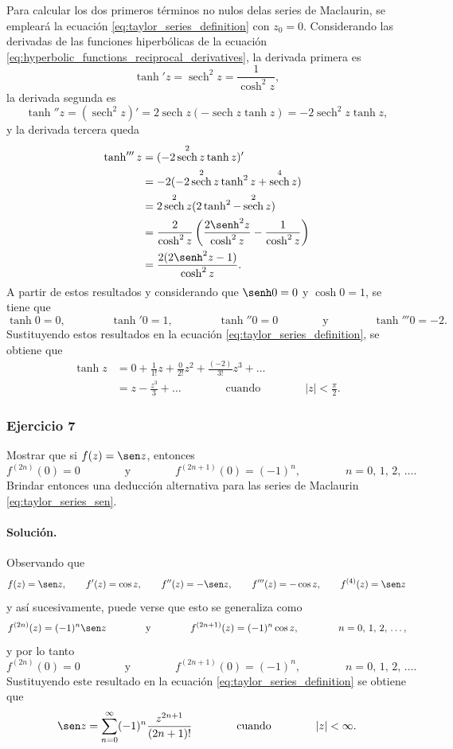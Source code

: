 \documentclass[a4paper]{report}
\DeclareMathOperator{\sech}{sech}
\begin{document}
Para calcular los dos primeros términos no nulos delas series de Maclaurin, se empleará la ecuación \ref{eq:taylor_series_definition} con \(z_0=0\). Considerando las derivadas de las funciones hiperbólicas de la ecuación \ref{eq:hyperbolic_functions_reciprocal_derivatives}, la derivada primera es
\[
 \tanh'z=\sech^2z=\frac{1}{\cosh^2z}, 
\]
la derivada segunda es
\[
 \tanh''z=(\sech^2z)'=2\sech z(-\sech z\tanh z)=-2\sech^2z\tanh z,
\]
y la derivada tercera queda
\begin{align*}
 \tanh'''z&=(-2\sech^2z\tanh z)'\\
  &=-2(-2\sech^2z\tanh^2z+\sech^4z)\\
  &=2\sech^2z(2\tanh^2-\sech^2z)\\
  &=\frac{2}{\cosh^2z}\left(\frac{2\senh^2z}{\cosh^2z}-\frac{1}{\cosh^2z}\right)\\
  &=\frac{2(2\senh^2z-1)}{\cosh^2z}.
\end{align*}
A partir de estos resultados y considerando que \(\senh0=0\) y \(\cosh0=1\), se tiene que 
\[
 \tanh0=0,
 \qquad\qquad
 \tanh'0=1,
 \qquad\qquad 
 \tanh''0=0
 \qquad\qquad\textrm{y}\qquad\qquad 
 \tanh'''0=-2.
\]
Sustituyendo estos resultados en la ecuación \ref{eq:taylor_series_definition}, se obtiene que 
\begin{align*}
 \tanh z&=0+\frac{1}{1!}z+\frac{0}{2!}z^2+\frac{(-2)}{3!}z^3+\dots\\
   &=z-\frac{z^3}{3}+\dots
   \qquad\qquad\textrm{cuando}\qquad\qquad
 |z|<\frac{\pi}{2}.
\end{align*}

\subsubsection*{Ejercicio 7}

Mostrar que si \(f(z)=\sen z\), entonces
\[
 f^{(2n)}(0)=0
 \qquad\qquad\textrm{y}\qquad\qquad
 f^{(2n+1)}(0)=(-1)^n,
 \qquad\qquad 
 n=0,\,1,\,2,\,\dots.
\]
Brindar entonces una deducción alternativa para las series de Maclaurin \ref{eq:taylor_series_sen}.

\paragraph{Solución.} Observando que 
\[
 f(z)=\sen z,\qquad 
 f'(z)=\cos z,\qquad
 f''(z)=-\sen z,\qquad
 f'''(z)=-\cos z,\qquad
 f^{(4)}(z)=\sen z
\]
y así sucesivamente, puede verse que esto se generaliza como
\[
 f^{(2n)}(z)=(-1)^n\sen z
 \qquad\qquad\textrm{y}\qquad\qquad
 f^{(2n+1)}(z)=(-1)^n\cos z,
 \qquad\qquad 
 n=0,\,1,\,2,\,\dots,
\]
y por lo tanto
\[
 f^{(2n)}(0)=0
 \qquad\qquad\textrm{y}\qquad\qquad
 f^{(2n+1)}(0)=(-1)^n,
 \qquad\qquad 
 n=0,\,1,\,2,\,\dots.
\]
Sustituyendo este resultado en la ecuación \ref{eq:taylor_series_definition} se obtiene que 
\[
 \sen z=\sum_{n=0}^\infty(-1)^n\frac{z^{2n+1}}{(2n+1)!}
 \qquad\qquad\textrm{cuando}\qquad\qquad
 |z|<\infty.
\]
\end{document}
